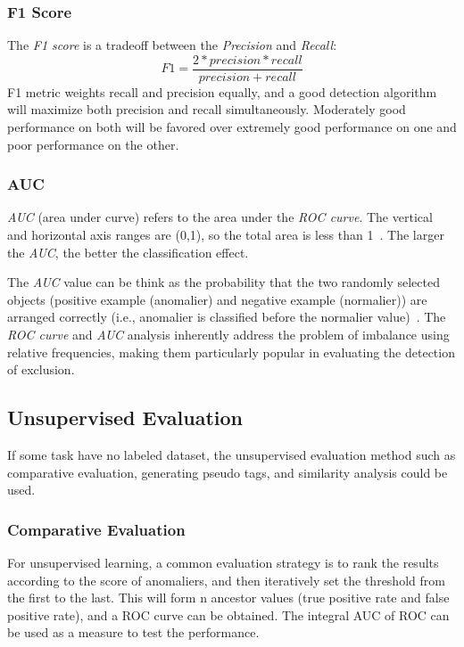 \subsubsection{F1 Score}
The \textit{F1 score} is a tradeoff between
the \textit{Precision} and \textit{Recall}:
\begin{equation}
  F1=\frac{2*precision*recall}{precision+recall}
\end{equation}
F1 metric weights recall and
precision equally,
and a good detection algorithm will
maximize both precision and
recall simultaneously.
Moderately good performance on
both will be favored over
extremely good performance on
one and poor performance on the other.

\subsubsection{AUC}
\textit{AUC} (area under curve) refers to the area under the \textit{ROC curve}.
The vertical and horizontal axis ranges are (0,1),
so the total area is less than 1~\cite{bradley1997use}.
The larger the \textit{AUC},
the better the classification effect.

The \textit{AUC} value can be think as the probability that
the two randomly selected objects (positive example (anomalier)
and negative example (normalier)) are arranged correctly
(i.e.,
anomalier is classified before the normalier value)~\cite{hanley1982meaning}.
The \textit{ROC curve} and \textit{AUC}
analysis inherently address the problem of imbalance using
relative frequencies,
making them particularly popular in evaluating
the detection of exclusion.


\subsection{Unsupervised Evaluation}
If some task have no labeled dataset,
the unsupervised evaluation method
such as comparative evaluation,
generating pseudo tags,
and similarity analysis could be used.

\subsubsection{Comparative Evaluation}

For unsupervised learning,
a common evaluation strategy is to rank the
results according to the score of anomaliers,
and then iteratively set the threshold from
the first to the last.
This will form n ancestor values
(true positive rate and false positive rate),
and a ROC curve can be obtained.
The integral AUC of ROC can be used as a measure
to test the performance.


